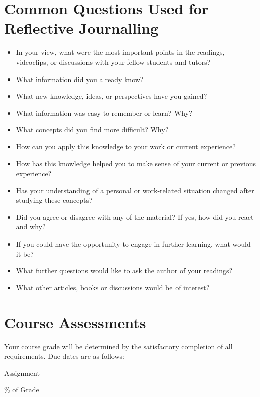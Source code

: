 \documentclass[
  letterpaper,
  DIV=11,
  numbers=noendperiod]{scrreprt}
\providecommand{\tightlist}{%
  \setlength{\itemsep}{0pt}\setlength{\parskip}{0pt}}\usepackage{longtable,booktabs,array}
\begin{document}

\chapter{Common Questions Used for Reflective
Journalling}\label{common-questions-used-for-reflective-journalling}

\begin{itemize}
\tightlist
\item
  In your view, what were the most important points in the readings,
  videoclips, or discussions with your fellow students and tutors?
\item
  What information did you already know?
\item
  What new knowledge, ideas, or perspectives have you gained?
\item
  What information was easy to remember or learn? Why?
\item
  What concepts did you find more difficult? Why?
\item
  How can you apply this knowledge to your work or current experience?
\item
  How has this knowledge helped you to make sense of your current or
  previous experience?
\item
  Has your understanding of a personal or work-related situation changed
  after studying these concepts?
\item
  Did you agree or disagree with any of the material? If yes, how did
  you react and why?
\item
  If you could have the opportunity to engage in further learning, what
  would it be?
\item
  What further questions would like to ask the author of your readings?
\item
  What other articles, books or discussions would be of interest?
\end{itemize}


\chapter{Course Assessments}\label{course-assessments}

Your course grade will be determined by the satisfactory completion of
all requirements. Due dates are as follows:

Assignment

\% of Grade
\end{document}
